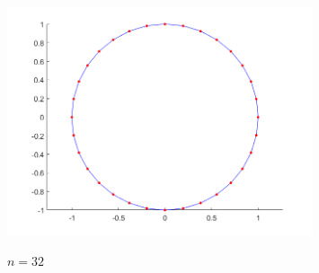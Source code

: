 \documentclass[utf8]{ctexart}
\begin{document}
\begin{figure}[H]
    \centering
    \includegraphics[width=0.8\textwidth]{geomHermite_n32.png}
    \label{fig12}
    \caption{$n=32$}
\end{figure}
\end{document}
